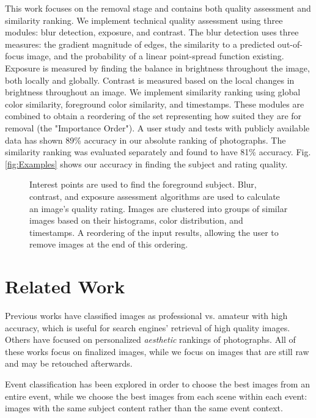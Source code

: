 \documentclass{sig-alternate}
\begin{document}
This work focuses on the removal stage and contains both quality assessment and similarity ranking. We implement technical quality assessment using three modules: blur detection, exposure, and contrast. The blur detection uses three measures: the gradient magnitude of edges, the similarity to a predicted out-of-focus image, and the probability of a linear point-spread function existing. Exposure is measured by finding the balance in brightness throughout the image, both locally and globally. Contrast is measured based on the local changes in brightness throughout an image. We implement similarity ranking using global color similarity, foreground color similarity, and timestamps.  These modules are combined to obtain a reordering of the set representing how suited they are for removal (the "Importance Order"). A user study and tests with publicly available data has shown 89\% accuracy in our absolute ranking of photographs. The similarity ranking was evaluated separately and found to have 81\% accuracy. Fig. \ref{fig:Examples} shows our accuracy in finding the subject and rating quality.

\begin{figure*}
  \centering
  \caption{Interest points are used to find the foreground subject. Blur, contrast, and exposure assessment algorithms are used to calculate an image's quality rating. Images are clustered into groups of similar images based on their histograms, color distribution, and timestamps. A reordering of the input results, allowing the user to remove images at the end of this ordering.}
  \label{flowchart}
\end{figure*}

\section{Related Work}

Previous works have classified images as professional vs. amateur with high accuracy\cite{1640788}\cite{springerlink:10.1007/11744078_23}\cite{springerlink:10.1007/978-3-540-88690-7_29}, which is useful for search engines' retrieval of high quality images. Others have focused on personalized \emph{aesthetic} rankings of photographs\cite {Sun:2009:PAB:1631272.1631351}\cite {Yeh:2010:PPR:1873951.1873963}. All of these works focus on finalized images, while we focus on images that are still raw and may be retouched afterwards.

Event classification has been explored in order to choose the best images from an entire event\cite{1223566}\cite{4444209}, while we choose the best images from each scene within each event: images with the same subject content rather than the same event context.
\end{document}
